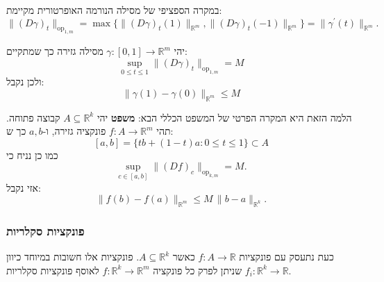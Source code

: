 \documentclass{tstextbook}
\begin{document}
\begin{remark}
במקרה הספציפי של מסילה הנורמה האופרטורית מקיימת:
$$\|(D\gamma)_{t}\|_{\mathrm{op}_{1,m}}=\operatorname*{max}\{\|(D\gamma)_{t}(1)\|_{\mathbb{R}^{m}},\|(D\gamma)_{t}(-1)\|_{\mathbb{R}^{m}}\}=\|\gamma^{\prime}(t)\|_{\mathbb{R}^{m}}.$$

\end{remark}
\begin{lemma}
יהי \(\gamma:[0,1]\to\mathbb{R}^m\) מסילה גזירה כך שמתקיים:
$$\operatorname*{sup}_{0\leq t\leq1}\|(D\gamma)_{t}\|_{\mathrm{op}_{1,m}}=M$$
ולכן נקבל:
$$\|\gamma(1)-\gamma(0)\|_{\mathbb{R}^{m}}\leq M$$

\end{lemma}
הלמה הזאת היא המקרה הפרטי של המשפט הכללי הבא:
\textbf{משפט}
יהי \(A\subseteq \mathbb{R}^k\) קבוצה פתוחה. תהי \(f:A\to\mathbb{R}^m\) פונקציה גזירה, ו-\(a,b\) כך ש:
$$[a,b]=\{t b+(1-t)a\colon0\leq t\leq1\}\subset A$$
כמו כן נניח כי
$$\operatorname*{sup}_{c\in[a,b]}\|(D f)_{c}\|_{\mathrm{op}_{k,m}}=M.$$
אזי נקבל:
$$\|f(b)-f(a)\|_{\mathbb{R}^{m}}\leq M\,\|b-a\|_{\mathbb{R}^{k}}.$$

\subsubsection{פונקציות סקלריות}

כעת נתעסק עם פונקציות \(f:A\to \mathbb{R}\) כאשר \(A\subseteq \mathbb{R}^k\). פונקציות אלו חשובות במיוחד כיוון שניתן לפרק כל פונקציה \(f:\mathbb{R}^k\to\mathbb{R}^m\) לאוסף פונקציות סקלריות \(f_{i}:\mathbb{R}^k\to\mathbb{R}\).
\end{document}

